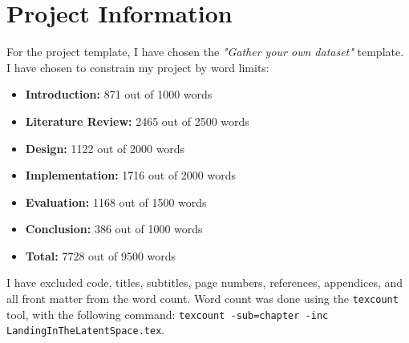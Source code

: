 
{}

\vspace*{3cm}

\begingroup
\chapter*{Project Information}

For the project template, I have chosen the \emph{"Gather your own dataset"} template. 
I have chosen to constrain my project by word limits:

\begin{itemize}
    \item \textbf{Introduction:} 871 out of 1000 words
    \item \textbf{Literature Review:} 2465 out of 2500 words
    \item \textbf{Design:} 1122 out of 2000 words
    \item \textbf{Implementation:} 1716 out of 2000 words
    \item \textbf{Evaluation:} 1168 out of 1500 words
    \item \textbf{Conclusion:} 386 out of 1000 words
    \item \textbf{Total:} 7728 out of 9500 words
\end{itemize}

I have excluded code, titles, subtitles, page numbers, references, appendices, and all front matter from the word count. Word count was done using the \texttt{texcount} tool,
with the following command: \texttt{texcount -sub=chapter -inc LandingInTheLatentSpace.tex}.


\endgroup

